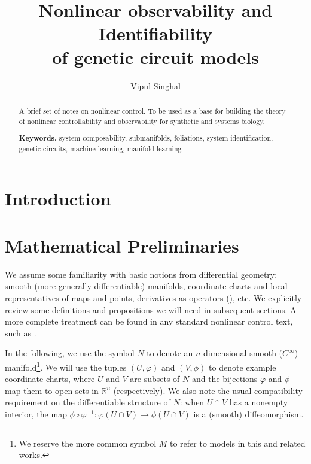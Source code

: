 \documentclass[psamsfonts]{amsart}
\title{Nonlinear observability and Identifiability\\ of genetic circuit models}
\author{Vipul Singhal}
\theoremstyle{definition}
\theoremstyle{remark}
\newcommand*\R{\mathds{R}}
\numberwithin{equation}{section}
\begin{document}
\begin{abstract}
A brief set of notes on nonlinear control. To be used as a base for building the theory of nonlinear controllability and observability for synthetic and systems biology. 




\noindent \textbf{Keywords.} system composability, submanifolds, foliations, system identification, genetic circuits, machine learning, manifold learning
\end{abstract}

\maketitle
\tableofcontents

\section{Introduction}

\section{Mathematical Preliminaries}
We assume some familiarity with basic notions from differential geometry: smooth (more generally differentiable) manifolds, coordinate charts and local representatives of maps and points, derivatives as operators (\cite{boothby_2002}), etc. We explicitly review some definitions and propositions we will need in subsequent sections. A more complete treatment can be found in any standard nonlinear control text, such as \cite{nijmeijer_nonlinear_1990}. 

In the following, we use the symbol $N$ to denote an $n$-dimensional smooth ($C^{\infty}$) manifold\footnote{We reserve the more common symbol $M$ to refer to models in this and related works.}. We will use the tuples $(U, \varphi)$ and $(V, \phi)$ to denote example coordinate charts, where $U$ and $V$ are subsets of $N$ and the bijections $\varphi$ and $\phi$ map them to open sets in $\R^n$ (respectively). We also note the usual compatibility requirement on the differentiable structure of $N$: when $U \cap V$ has a nonempty interior, the map $\phi\circ\varphi^{-1}: \varphi(U\cap V) \rightarrow \phi(U\cap V)$ is a (smooth) diffeomorphism.
\end{document}
